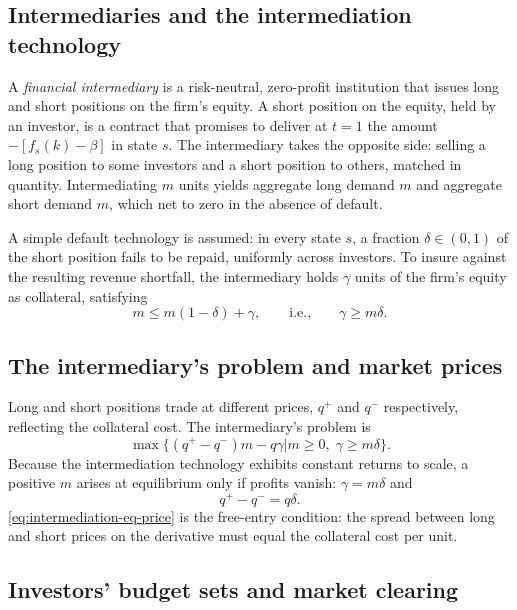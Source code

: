\documentclass[11pt,a4paper,oneside]{book}
\def\leq{\leqslant}
\def\geq{\geqslant}
\theoremstyle{plain}
\theoremstyle{definition}
\theoremstyle{remark}
\numberwithin{equation}{chapter}
\begin{document}
\subsection{Intermediaries and the intermediation technology}

A \emph{financial intermediary} is a risk-neutral, zero-profit institution that issues long and short positions on the firm's equity.
A short position on the equity, held by an investor, is a contract that promises to deliver at $t=1$ the amount $-[f_s(k) - \beta]$ in state $s$.
The intermediary takes the opposite side: selling a long position to some investors and a short position to others, matched in quantity.
Intermediating $m$ units yields aggregate long demand $m$ and aggregate short demand $m$, which net to zero in the absence of default.

A simple default technology is assumed: in every state $s$, a fraction $\delta \in (0, 1)$ of the short position fails to be repaid, uniformly across investors.
To insure against the resulting revenue shortfall, the intermediary holds $\gamma$ units of the firm's equity as collateral, satisfying
\begin{equation}\label{eq:collateral}
  m \leq m(1 - \delta) + \gamma,
  \qquad \text{i.e.,} \qquad
  \gamma \geq m \delta.
\end{equation}

\subsection{The intermediary's problem and market prices}

Long and short positions trade at different prices, $q^+$ and $q^-$ respectively, reflecting the collateral cost.
The intermediary's problem is
\begin{equation}\label{eq:intermediary}
  \max \bigl\{ (q^+ - q^-) m - q \gamma \vert m \geq 0, \; \gamma \geq m \delta \bigr\}.
\end{equation}
Because the intermediation technology exhibits constant returns to scale, a positive $m$ arises at equilibrium only if profits vanish: $\gamma = m \delta$ and
\begin{equation}\label{eq:intermediation-eq-price}
  q^+ - q^- = q \delta.
\end{equation}
\eqref{eq:intermediation-eq-price} is the free-entry condition: the spread between long and short prices on the derivative must equal the collateral cost per unit.

\subsection{Investors' budget sets and market clearing}
\end{document}

